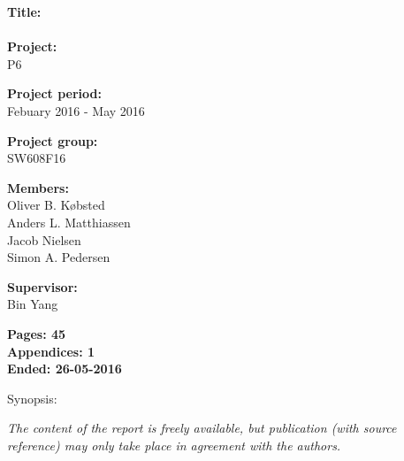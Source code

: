 \begin{minipage}[t]{0.48\textwidth}
\textbf{Title:} \\[5pt]\bigskip\hspace{2ex}    
\name\\
\textbf{Project:} \\[5pt]\bigskip\hspace{2ex}
P6

\textbf{Project period:} \\[5pt]\bigskip\hspace{2ex}
Febuary 2016 - May 2016

\textbf{Project group:} \\[5pt]\bigskip\hspace{2ex}
SW608F16

\textbf{Members:} \\[5pt]\hspace*{2ex}
Oliver B. Købsted \\\hspace*{2ex}
Anders L. Matthiassen \\\hspace*{2ex}
Jacob Nielsen \\\hspace*{2ex}
Simon A. Pedersen \\\hspace*{2ex}


\textbf{Supervisor:} \\[5pt]\hspace*{2ex}
Bin Yang


\vspace*{1cm}

\textbf{Pages: 45} \\
\textbf{Appendices: 1} \\
\textbf{Ended: 26-05-2016}

\end{minipage}
\hfill
\begin{minipage}[t]{0.483\textwidth}
Synopsis: \\[5pt]
\fbox{\parbox{7cm}{\bigskip\bigskip}}
\end{minipage}

\vfill

{\footnotesize\itshape The content of the report is freely available, but publication (with source reference) may only take place in agreement with the authors.}

